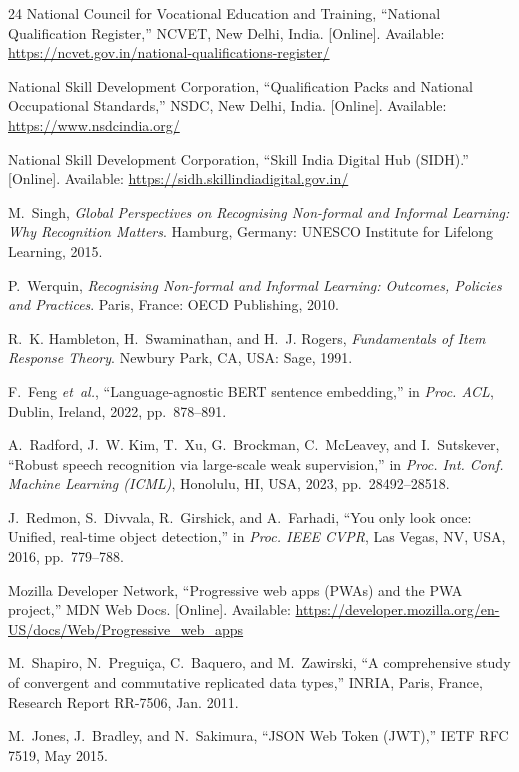 \documentclass[conference]{IEEEtran}
\newcommand{\etal}{\textit{et~al.}}
\begin{document}
\begin{thebibliography}{24}
National Council for Vocational Education and Training, ``National Qualification
Register,'' NCVET, New Delhi, India. [Online]. Available:
\url{https://ncvet.gov.in/national-qualifications-register/}

National Skill Development Corporation, ``Qualification Packs and National Occupational
Standards,'' NSDC, New Delhi, India. [Online]. Available:
\url{https://www.nsdcindia.org/}

National Skill Development Corporation, ``Skill India Digital Hub (SIDH).'' [Online].
Available: \url{https://sidh.skillindiadigital.gov.in/}

M.~Singh, \emph{Global Perspectives on Recognising Non-formal and Informal Learning: Why
Recognition Matters}. Hamburg, Germany: UNESCO Institute for Lifelong Learning, 2015.

P.~Werquin, \emph{Recognising Non-formal and Informal Learning: Outcomes, Policies and
Practices}. Paris, France: OECD Publishing, 2010.

R.~K. Hambleton, H.~Swaminathan, and H.~J. Rogers, \emph{Fundamentals of Item Response
Theory}. Newbury Park, CA, USA: Sage, 1991.

F.~Feng \etal, ``Language-agnostic BERT sentence embedding,'' in \emph{Proc. ACL}, Dublin,
Ireland, 2022, pp.~878--891.

A.~Radford, J.~W. Kim, T.~Xu, G.~Brockman, C.~McLeavey, and I.~Sutskever, ``Robust speech
recognition via large-scale weak supervision,'' in \emph{Proc. Int. Conf. Machine Learning
(ICML)}, Honolulu, HI, USA, 2023, pp.~28492--28518.

J.~Redmon, S.~Divvala, R.~Girshick, and A.~Farhadi, ``You only look once: Unified,
real-time object detection,'' in \emph{Proc. IEEE CVPR}, Las Vegas, NV, USA, 2016,
pp.~779--788.

Mozilla Developer Network, ``Progressive web apps (PWAs) and the PWA project,'' MDN Web
Docs. [Online]. Available:
\url{https://developer.mozilla.org/en-US/docs/Web/Progressive_web_apps}

M.~Shapiro, N.~Pregui\c{c}a, C.~Baquero, and M.~Zawirski, ``A comprehensive study of
convergent and commutative replicated data types,'' INRIA, Paris, France, Research Report
RR-7506, Jan. 2011.

M.~Jones, J.~Bradley, and N.~Sakimura, ``JSON Web Token (JWT),'' IETF RFC 7519, May 2015.


\end{thebibliography}
\end{document}
